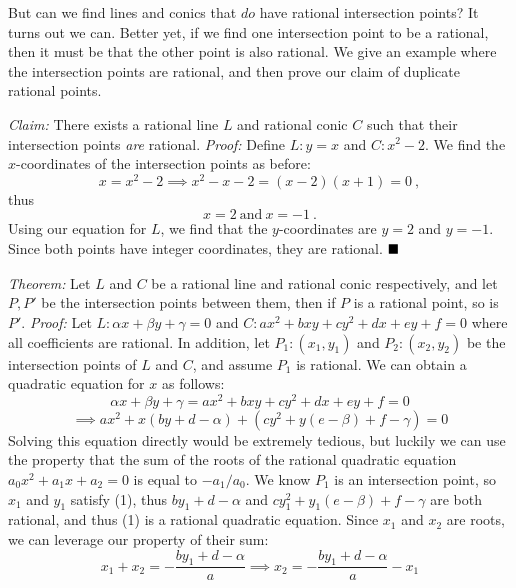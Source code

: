 \documentclass[12pt]{book}
\newcommand{\claim}{\textit{Claim:} }
\newcommand{\theorem}{\textit{Theorem:} }
\newcommand{\proof}{\textit{Proof:} }
\newcommand{\done}{\ensuremath{\strut\hfill\blacksquare}}
\newcommand{\proofbox}[2]{\begin{tcolorbox}[
    colback=blue!5!white,
    colframe=blue!50!black,
    adjusted title=\textbf{#1},
    before skip=0.25in,
    after skip=0.25in]
    #2
\end{tcolorbox}}
\begin{document}
    But can we find lines and conics that $\textit{do}$ have rational intersection points? It turns out we can. Better yet, if we find one intersection point to be a rational, then it must be that the other point is also rational. We give an example where the intersection points are rational, and then prove our claim of duplicate rational points.

    \proofbox{Example 1.1.2}{
        \claim There exists a rational line $L$ and rational conic $C$ such that their intersection points \textit{are} rational.
        \tcblower
        \proof Define $L:y=x$ and $C:x^2-2$. We find the $x$-coordinates of the intersection points as before:
        \[x=x^2-2\implies x^2-x-2=(x-2)(x+1)=0\ ,\]
        thus
        \[x=2\ \text{and}\ x=-1\ .\]
        Using our equation for $L$, we find that the $y$-coordinates are $y=2$ and $y=-1$. Since both points have integer coordinates, they are rational. \done
    }

    \proofbox{Theorem 1.1.3}{
        \theorem Let $L$ and $C$ be a rational line and rational conic respectively, and let $P,P'$ be the intersection points between them, then if $P$ is a rational point, so is $P'$.
        \tcblower
        \proof Let $L:\alpha x+\beta y+\gamma=0$ and $C:ax^2+bxy+cy^2+dx+ey+f=0$ where all coefficients are rational. In addition, let $P_1:(x_1,y_1)$ and $P_2:(x_2,y_2)$ be the intersection points of $L$ and $C$, and assume $P_1$ is rational. We can obtain a quadratic equation for $x$ as follows:
        \[\alpha x+\beta y+\gamma=ax^2+bxy+cy^2+dx+ey+f=0\]
        \begin{equation}\tag{1}
            \implies ax^2+x(by+d-\alpha)+(cy^2+y(e-\beta)+f-\gamma)=0
        \end{equation}
        Solving this equation directly would be extremely tedious, but luckily we can use the property that the sum of the roots of the rational quadratic equation $a_0x^2+a_1x+a_2=0$ is equal to $-a_1/a_0$. We know $P_1$ is an intersection point, so $x_1$ and $y_1$ satisfy (1), thus $by_1+d-\alpha$ and $cy_1^2+y_1(e-\beta)+f-\gamma$ are both rational, and thus (1) is a rational quadratic equation. Since $x_1$ and $x_2$ are roots, we can leverage our property of their sum:
        \[x_1+x_2=-\frac{by_1+d-\alpha}{a}\implies x_2=-\frac{by_1+d-\alpha}{a}-x_1\]
    }
\end{document}
